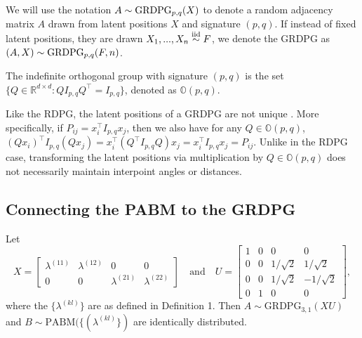 \documentclass[12pt]{article}
\begin{document}
We will use the notation \(A \sim \mathrm{GRDPG}_{p,q}(X)\) to denote a random
adjacency matrix \(A\) drawn from latent positions \(X\) and signature
\((p, q)\). If instead of fixed latent positions, they are drawn $X_1, ..., X_n \stackrel{\mathrm{iid}}{\sim} F$, we denote the GRDPG as $(A, X) \sim \mathrm{GRDPG}_{p,q}(F, n)$.

\begin{definition}
The indefinite orthogonal group with signature $(p, q)$ is
the set $\{Q \in \mathbb{R}^{d \times d} : Q I_{p, q} Q^{\top} = I_{p, q}\}$,
denoted as $\mathbb{O}(p, q)$.
\end{definition}

\begin{remark}
Like the RDPG, the latent positions of a GRDPG are not unique
\cite{rubindelanchy2017statistical}.
More specifically, if $P_{ij} = x_i^\top I_{p, q} x_j$, then we also have for any
$Q \in \mathbb{O}(p, q)$,
$(Q x_i)^\top I_{p, q} (Q x_j) = x_i^\top (Q^\top I_{p, q} Q) x_j =
x_i^\top I_{p, q} x_j = P_{ij}$.
Unlike in the RDPG case, transforming the latent positions via multiplication
by $Q \in \mathbb{O}(p, q)$ does not necessarily maintain interpoint angles or
distances.
\end{remark}

\hypertarget{connecting-the-pabm-to-the-grdpg}{%
\subsection{Connecting the PABM to the
GRDPG}\label{connecting-the-pabm-to-the-grdpg}}
\begin{proposition}[Connecting the PABM to the GRDPG for $K = 2$]
\label{theorem1}
Let
$$X = \begin{bmatrix}
\lambda^{(11)} & \lambda^{(12)} & 0 & 0 \\
0 & 0 & \lambda^{(21)} & \lambda^{(22)}
\end{bmatrix} \quad \text{and} \quad
U = \begin{bmatrix} 1 & 0 & 0 & 0 \\
0 & 0 & 1 / \sqrt{2} & 1 / \sqrt{2} \\
0 & 0 & 1 / \sqrt{2} & - 1 / \sqrt{2} \\
0 & 1 & 0 & 0 \end{bmatrix},$$
where the $\{\lambda^{(kl)}\}$ are as defined in Definition 1.
Then $A \sim \mathrm{GRDPG}_{3, 1}(X U)$ and $B \sim \mathrm{PABM}(\{(\lambda^{(kl)}\})$ are
identically distributed.
\end{proposition}
\end{document}
